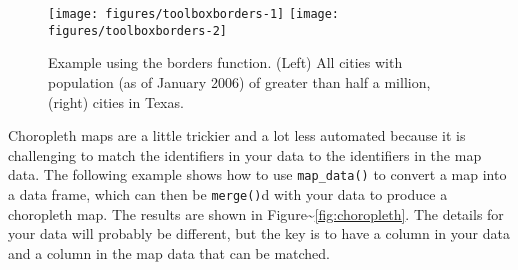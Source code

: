 \begin{figure}
\texttt{[image: figures/toolboxborders-1]} \texttt{[image: figures/toolboxborders-2]} \caption{Example using the borders function.  (Left) All cities with population (as of January 2006) of greater than half a million, (right) cities in Texas.\label{fig:borders}}
\end{figure}

Choropleth maps are a little trickier and a lot less automated because
it is challenging to match the identifiers in your data to the
identifiers in the map data. The following example shows how to use
\texttt{map\_data()} to convert a map into a data frame, which can then
be \texttt{merge()}d with your data to produce a choropleth map. The
results are shown in Figure\textasciitilde{}\ref{fig:choropleth}. The
details for your data will probably be different, but the key is to have
a column in your data and a column in the map data that can be matched.

\begin{Shaded}
\begin{Highlighting}[]
\StringTok{ }\NormalTok{(}\NormalTok{)}
\StringTok{ }
\StringTok{ }\NormalTok{(}
\StringTok{ }\NormalTok{(}

\StringTok{ } \NormalTok{)}
\StringTok{ }\NormalTok{choro[}\NormalTok{(choro$order), ]}
  
    \NormalTok{)}
  
   \StringTok{ } \NormalTok{)}
\end{Highlighting}
\end{Shaded}


